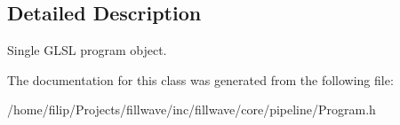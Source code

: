 \subsection{Detailed Description}
Single G\+L\+SL program object. 

The documentation for this class was generated from the following file\+:\begin{DoxyCompactItemize}
\item 
/home/filip/\+Projects/fillwave/inc/fillwave/core/pipeline/Program.\+h\end{DoxyCompactItemize}
